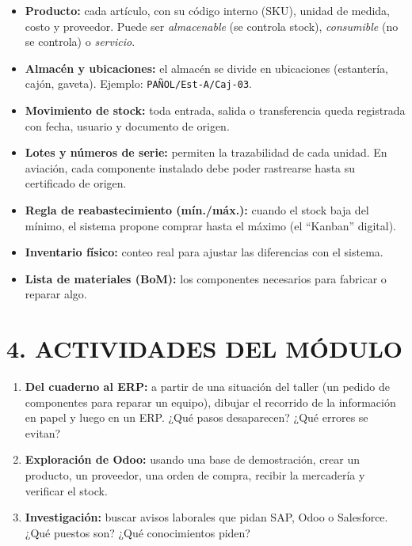 \begin{itemize}
  \item \textbf{Producto:} cada artículo, con su código interno (SKU), unidad de medida, costo
        y proveedor. Puede ser \textit{almacenable} (se controla stock), \textit{consumible}
        (no se controla) o \textit{servicio}.
  \item \textbf{Almacén y ubicaciones:} el almacén se divide en ubicaciones (estantería, cajón,
        gaveta). Ejemplo: \texttt{PAÑOL/Est-A/Caj-03}.
  \item \textbf{Movimiento de stock:} toda entrada, salida o transferencia queda registrada
        con fecha, usuario y documento de origen.
  \item \textbf{Lotes y números de serie:} permiten la trazabilidad de cada unidad. En
        aviación, cada componente instalado debe poder rastrearse hasta su certificado de
        origen.
  \item \textbf{Regla de reabastecimiento (mín./máx.):} cuando el stock baja del mínimo, el
        sistema propone comprar hasta el máximo (el ``Kanban'' digital).
  \item \textbf{Inventario físico:} conteo real para ajustar las diferencias con el sistema.
  \item \textbf{Lista de materiales (BoM):} los componentes necesarios para fabricar o reparar
        algo.
\end{itemize}

\section*{4. ACTIVIDADES DEL MÓDULO}

\begin{enumerate}
  \item \textbf{Del cuaderno al ERP:} a partir de una situación del taller (un pedido de
        componentes para reparar un equipo), dibujar el recorrido de la información en papel y
        luego en un ERP. ¿Qué pasos desaparecen? ¿Qué errores se evitan?
  \item \textbf{Exploración de Odoo:} usando una base de demostración, crear un producto, un
        proveedor, una orden de compra, recibir la mercadería y verificar el stock.
  \item \textbf{Investigación:} buscar avisos laborales que pidan SAP, Odoo o Salesforce. ¿Qué
        puestos son? ¿Qué conocimientos piden?
\end{enumerate}
